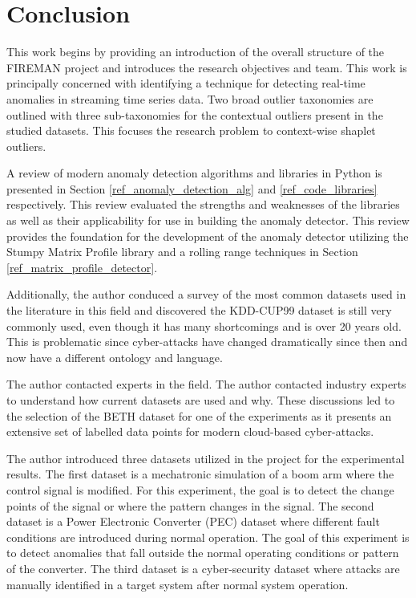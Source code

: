 \section{Conclusion}
\label{sec:conclusion}

This work begins by providing an introduction of the overall structure of the FIREMAN project and introduces the research objectives and team. This work is principally concerned with identifying a technique for detecting real-time anomalies in streaming time series data. Two broad outlier taxonomies are outlined with three sub-taxonomies for the contextual outliers present in the studied datasets. This focuses the research problem to context-wise shaplet outliers.

A review of modern anomaly detection algorithms and libraries in Python is presented in Section \ref{ref_anomaly_detection_alg} and \ref{ref_code_libraries} respectively. This review evaluated the strengths and weaknesses of the libraries as well as their applicability for use in building the anomaly detector. This review provides the foundation for the development of the anomaly detector utilizing the Stumpy Matrix Profile library and a rolling range techniques in Section \ref{ref_matrix_profile_detector}. 

Additionally, the author conduced a survey of the most common datasets used in the literature in this field and discovered the KDD-CUP99 dataset is still very commonly used, even though it has many shortcomings and is over 20 years old. This is problematic since cyber-attacks have changed dramatically since then and now have a different ontology and language.

The author contacted experts in the field. The author contacted industry experts to understand how current datasets are used and why. These discussions led to the selection of the BETH dataset for one of the experiments as it presents an extensive set of labelled data points for modern cloud-based cyber-attacks.

The author introduced three datasets utilized in the project for the experimental results. The first dataset is a mechatronic simulation of a boom arm where the control signal is modified. For this experiment, the goal is to detect the change points of the signal or where the pattern changes in the signal. The second dataset is a Power Electronic Converter (PEC) dataset where different fault conditions are introduced during normal operation. The goal of this experiment is to detect anomalies that fall outside the normal operating conditions or pattern of the converter. The third dataset is a cyber-security dataset where attacks are manually identified in a target system after normal system operation.

